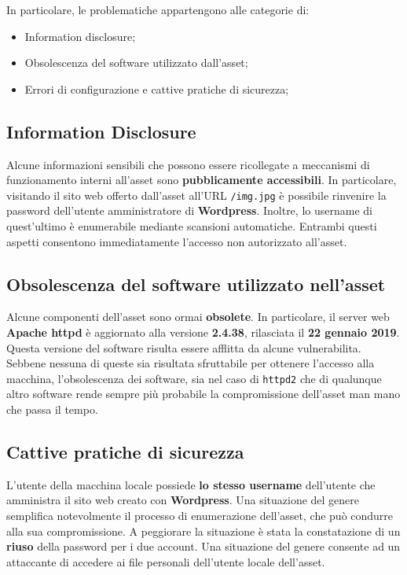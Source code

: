 \documentclass[a4paper, 12pt, oneside]{article}
\begin{document}
In particolare, le problematiche appartengono alle categorie di:

\begin{itemize}
    \item Information disclosure;
    \item Obsolescenza del software utilizzato dall'asset;
    \item Errori di configurazione e cattive pratiche di sicurezza;
\end{itemize}

\subsection{Information Disclosure}
Alcune informazioni sensibili che possono essere ricollegate a meccanismi di funzionamento interni all'asset sono \textbf{pubblicamente accessibili}. In particolare, visitando il sito web offerto dall'asset all'URL \texttt{/img.jpg} è possibile rinvenire la password dell'utente amministratore di \textbf{Wordpress}. Inoltre, lo username di quest'ultimo è enumerabile mediante scansioni automatiche. Entrambi questi aspetti consentono immediatamente l'accesso non autorizzato all'asset.

\subsection{Obsolescenza del software utilizzato nell'asset}
Alcune componenti dell'asset sono ormai \textbf{obsolete}. In particolare, il server web \textbf{Apache httpd} è aggiornato alla versione \textbf{2.4.38}, rilasciata il \textbf{22 gennaio 2019}. Questa versione del software risulta essere afflitta da alcune vulnerabilita. Sebbene nessuna di queste sia risultata sfruttabile per ottenere l'accesso alla macchina, l'obsolescenza dei software, sia nel caso di \texttt{httpd2} che di qualunque altro software rende sempre più probabile la compromissione dell'asset man mano che passa il tempo.

\subsection{Cattive pratiche di sicurezza}
L'utente della macchina locale possiede \textbf{lo stesso username} dell'utente che amministra il sito web creato con \textbf{Wordpress}. Una situazione del genere semplifica notevolmente il processo di enumerazione dell'asset, che può condurre alla sua compromissione. A peggiorare la situazione è stata la constatazione di un \textbf{riuso} della password per i due account. Una situazione del genere consente ad un attaccante di accedere ai file personali dell'utente locale dell'asset. 
\end{document}
